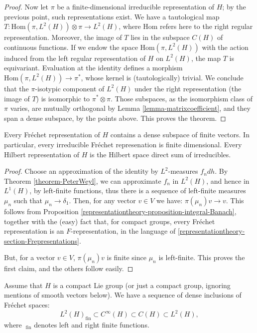 \begin{proof}
Now let $\pi$ be a finite-dimensional irreducible representation of $H$; by the previous point, such representations exist. We have a tautological map $T:\text{Hom}(\pi, L^2(H)) \otimes \pi\to L^2(H)$, where $\text{Hom}$ refers here to the right regular representation. Moreover, the image of $T$ lies in the subspace $C(H)$ of continuous functions. If we endow the space $\text{Hom}(\pi, L^2(H))$ with the action induced from the left regular representation of $H$ on $L^2(H)$, the map $T$ is equivariant. Evaluation at the identity defines a morphism $\text{Hom}(\pi, L^2(H)) \to \pi^*$, whose kernel is (tautologically) trivial. We conclude that the $\pi$-isotypic component of $L^2(H)$ under the right representation (the image of $T$) is isomorphic to $\pi^*\otimes \pi$. Those subspaces, as the isomorphism class of $\pi$ varies, are mutually orthogonal by Lemma \ref{lemma-matrixcoefficient}, and they span a dense subspace, by the points above. This proves the theorem.
\end{proof}


\begin{theorem}
\label{theorem-PeterWeyl-general}
 Every Fr\'echet representation of $H$ contains a dense subspace of finite vectors. In particular, every irreducible Fr\'echet represenation is finite dimensional. Every Hilbert representation of $H$ is the Hilbert space direct sum of irreducibles.
\end{theorem}


\begin{proof}

Choose an approximation of the identity by $L^2$-measures $f_ndh$. By Theorem \ref{theorem-PeterWeyl}, we can approximate $f_n$ in $L^2(H)$, and hence in $L^1(H)$, by left-finite functions, thus there is a sequence of left-finite measures $\mu_n$ such that $\mu_n\to \delta_1$. Then, for any vector $v\in V$ we have: $\pi(\mu_n)v\to v$. This follows from Proposition \ref{representationtheory-proposition-integral-Banach}, together with the (easy) fact that, for compact groups, every Fr\'echet representation is an $F$-representation, in the language of \ref{representationtheory-section-Frepresentations}.

But, for a vector $v\in V$, $\pi(\mu_n)v$ is finite since $\mu_n$ is left-finite. This proves the first claim, and the others follow easily.

\end{proof}




\begin{proposition}
\label{proposition-denseinclusions} 
Assume that $H$ is a compact Lie group (or just a compact group, ignoring mentions of smooth vectors below). We have a sequence of dense inclusions of Fr\'echet spaces:
\begin{equation}
 L^2(H)_{\text{fin}} \subset C^\infty(H) \subset C(H)\subset L^2(H),
\end{equation}
where $~_{\text{fin}}$ denotes left and right finite functions.
\end{proposition}

